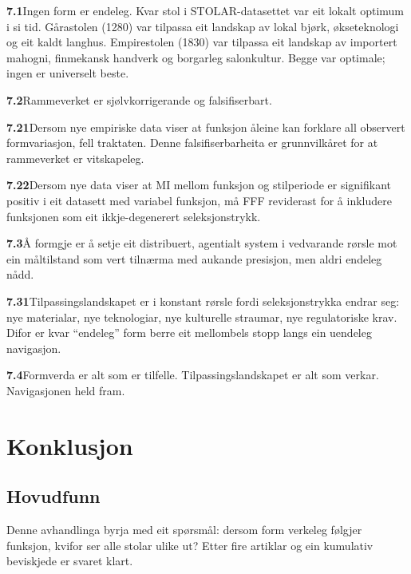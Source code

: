 \documentclass[12pt, a4paper]{article}
\begin{document}
\medskip
\noindent\textbf{7.1}\quad Ingen form er endeleg. Kvar stol i STOLAR-datasettet var eit lokalt optimum i si tid. Gårastolen (1280) var tilpassa eit landskap av lokal bjørk, økseteknologi og eit kaldt langhus. Empirestolen (1830) var tilpassa eit landskap av importert mahogni, finmekansk handverk og borgarleg salonkultur. Begge var optimale; ingen er universelt beste.

\medskip
\noindent\textbf{7.2}\quad Rammeverket er sjølvkorrigerande og falsifiserbart.

\medskip
\noindent\textbf{7.21}\quad Dersom nye empiriske data viser at funksjon åleine kan forklare all observert formvariasjon, fell traktaten. Denne falsifiserbarheita er grunnvilkåret for at rammeverket er vitskapeleg.

\medskip
\noindent\textbf{7.22}\quad Dersom nye data viser at MI mellom funksjon og stilperiode er signifikant positiv i eit datasett med variabel funksjon, må FFF reviderast for å inkludere funksjonen som eit ikkje-degenerert seleksjonstrykk.

\medskip
\noindent\textbf{7.3}\quad Å formgje er å setje eit distribuert, agentialt system i vedvarande rørsle mot ein måltilstand som vert tilnærma med aukande presisjon, men aldri endeleg nådd.

\medskip
\noindent\textbf{7.31}\quad Tilpassingslandskapet er i konstant rørsle fordi seleksjonstrykka endrar seg: nye materialar, nye teknologiar, nye kulturelle straumar, nye regulatoriske krav. Difor er kvar ``endeleg'' form berre eit mellombels stopp langs ein uendeleg navigasjon.

\medskip
\noindent\textbf{7.4}\quad Formverda er alt som er tilfelle. Tilpassingslandskapet er alt som verkar. Navigasjonen held fram.


\section{Konklusjon}

\subsection{Hovudfunn}

Denne avhandlinga byrja med eit spørsmål: dersom form verkeleg følgjer funksjon, kvifor ser alle stolar ulike ut? Etter fire artiklar og ein kumulativ beviskjede er svaret klart.
\end{document}
